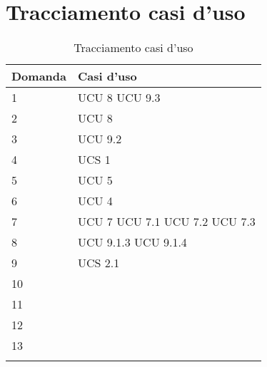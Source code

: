 	\section{Tracciamento casi d'uso}
	
	\begin{longtable}{ | p{3cm} | p{3cm} | }
	
	\hline
    \textbf{Domanda}  &  \textbf{Casi d'uso}   \\ \hline
   
    1 & UCU 8 \newline UCU 9.3  \\ \hline
    
    2 & UCU 8 \\ \hline
    
    3 & UCU 9.2 \\ \hline
    
    4 & UCS 1 \\ \hline
    
    5 & UCU 5 \\ \hline
    
    6 & UCU 4 \\ \hline
    
    7 & UCU 7 \newline 
    UCU 7.1 \newline
    UCU 7.2 \newline
    UCU 7.3  \\ \hline
    
    8 & UCU 9.1.3 \newline UCU 9.1.4 \\ \hline
    
    9 & UCS 2.1 \\ \hline
    
    10 &  \\ \hline
    
    11  & \\ \hline
    
    12 &  \\ \hline
    
    13 &  \\ \hline

\caption{Tracciamento casi d'uso}
\end{longtable}